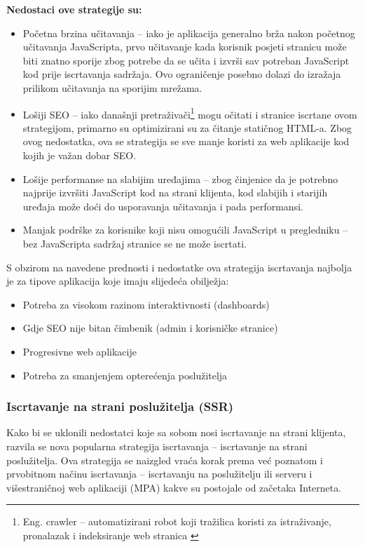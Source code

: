 \bigskip

\textbf{Nedostaci ove strategije su:}

\begin{itemize}
    \item Početna brzina učitavanja – iako je aplikacija generalno brža nakon početnog učitavanja JavaScripta, prvo učitavanje kada korisnik posjeti stranicu može biti znatno sporije zbog potrebe da se učita i izvrši sav potreban JavaScript kod prije iscrtavanja sadržaja. Ovo ograničenje posebno dolazi do izražaja prilikom učitavanja na sporijim mrežama.
    \item Lošiji SEO – iako današnji pretraživači\footnote{Eng. crawler – automatizirani robot koji tražilica koristi za istraživanje, pronalazak i indeksiranje web stranica \cite{googlesearch}} mogu očitati i stranice iscrtane ovom strategijom, primarno su optimizirani su za čitanje statičnog HTML-a. Zbog ovog nedostatka, ova se strategija se sve manje koristi za web aplikacije kod kojih je važan dobar SEO.
    \item Lošije performanse na slabijim uređajima – zbog činjenice da je potrebno najprije izvršiti JavaScript kod na strani klijenta, kod slabijih i starijih uređaja može doći do usporavanja učitavanja i pada performansi.
    \item Manjak podrške za korisnike koji nisu omogućili JavaScript u pregledniku – bez JavaScripta sadržaj stranice se ne može iscrtati.
\end{itemize}

S obzirom na navedene prednosti i nedostatke ova strategija iscrtavanja najbolja je za tipove aplikacija koje imaju slijedeća obilježja:
\begin{itemize}
    \item Potreba za visokom razinom interaktivnosti (dashboards)
    \item Gdje SEO nije bitan čimbenik (admin i korisničke stranice)
    \item Progresivne web aplikacije
    \item Potreba za smanjenjem opterećenja poslužitelja
\end{itemize}
\vfill

\subsubsection{Iscrtavanje na strani poslužitelja (SSR)}

Kako bi se uklonili nedostatci koje sa sobom nosi iscrtavanje na strani klijenta, razvila se nova popularna strategija iscrtavanja – iscrtavanje na strani poslužitelja. Ova strategija se naizgled vraća korak prema već poznatom i prvobitnom načinu iscrtavanja – iscrtavanju na poslužitelju ili serveru i višestraničnoj web aplikaciji (MPA) kakve su postojale od začetaka Interneta.

